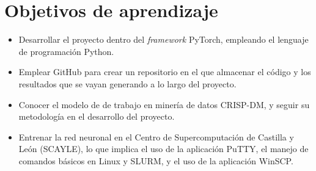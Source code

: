 \section{Objetivos de aprendizaje}
\begin{itemize}[itemsep=0.25em]
    \item Desarrollar el proyecto dentro del \textit{framework} PyTorch, empleando el lenguaje de programación Python.
    \item Emplear GitHub para crear un repositorio en el que almacenar el código y los resultados que se vayan generando a lo largo del proyecto.
    \item Conocer el modelo de de trabajo en minería de datos CRISP-DM, y seguir su metodología en el desarrollo del proyecto.
    \item Entrenar la red neuronal en el Centro de Supercomputación de Castilla y León (SCAYLE), lo que implica el uso de la aplicación PuTTY, el manejo de comandos básicos en Linux y SLURM, y el uso de la aplicación WinSCP.
\end{itemize}